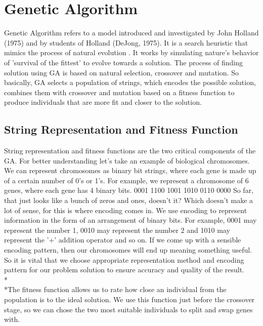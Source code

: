 \newcommand{\tab}{\hspace*{2em}}

\section{Genetic Algorithm}
Genetic Algorithm refers to a model introduced and investigated by John Holland (1975) and
by students of Holland (DeJong, 1975). It is a search heuristic that mimics the process of natural 
evolution \cite{Mitchell1996}.
It works by simulating nature's behavior of 'survival of 
the fittest' to evolve towards a solution. The process of finding solution using GA is based on 
natural selection, crossover and mutation. So basically, GA selects a population of strings, which 
encodes the possible solution, combines them with crossover and mutation based on a fitness function 
to produce individuals that are more fit and closer to the solution. 

\subsection{String Representation and Fitness Function}
String representation and fitness functions are the two critical components of the GA. For better understanding let’s take an example of biological chromosomes. We can represent chromosomes as binary bit strings, where each gene is made up of a certain number of 0’s or 1’s. For example, we represent a chromosome of 6 genes, where each gene has 4 binary bits. 0001 1100 1001 1010 0110 0000 So far, that just looks like a bunch of zeros and ones, doesn’t it? Which doesn’t make a lot of sense, for this is where encoding comes in. We use encoding to represent information in the form of an arrangement of binary bits. For example, 0001 may represent the number 1, 0010 may represent the number 2 and 1010 may represent the ’+’ addition operator and so on. If we come up with a sensible encoding pattern, then our chromosomes will end up meaning something useful. So it is vital that we choose appropriate representation method and encoding pattern for our problem solution to ensure accuracy and quality of the result. 
\\*\\*The fitness function allows us to rate how close an individual from the population is to the ideal solution. We use this function just before the crossover stage, so we can chose the two most suitable individuals to split and swap genes with. 

